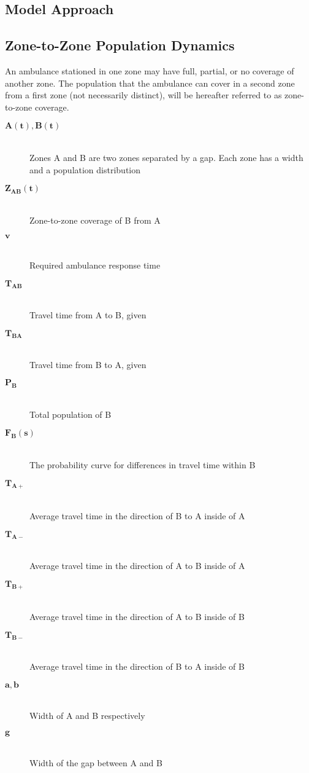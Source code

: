 \documentclass[notitlepage, 12pt]{article}
\begin{document}
\subsection{Model Approach}

\subsection{Zone-to-Zone Population Dynamics}
An ambulance stationed in one zone may have full, partial, or no coverage of another zone. The population
that the ambulance can cover in a second zone from a first zone (not necessarily distinct), will be hereafter referred to as
zone-to-zone coverage.
\begin{description}
    \item[$\mathbf{A(t), B(t)}$] \hfill \\
    	Zones A and B are two zones separated by a gap. Each zone has a width and a population distribution
    \item[$\mathbf{Z_{AB}(t)}$] \hfill \\
    	Zone-to-zone coverage of B from A
    \item[$\mathbf{v}$] \hfill \\
    	Required ambulance response time
    \item[$\mathbf{T_{AB}}$] \hfill \\
    	Travel time from A to B, given
    \item[$\mathbf{T_{BA}}$] \hfill \\
    	Travel time from B to A, given
    \item[$\mathbf{P_B}$] \hfill \\
    	Total population of B
    \item[$\mathbf{F_B(s)}$] \hfill \\
    	The probability curve for differences in travel time within B
    \item[$\mathbf{T_{A+}}$] \hfill \\
    	Average travel time in the direction of B to A inside of A
    \item[$\mathbf{T_{A-}}$] \hfill \\
    	Average travel time in the direction of A to B inside of A
    \item[$\mathbf{T_{B+}}$] \hfill \\
    	Average travel time in the direction of A to B inside of B
    \item[$\mathbf{T_{B-}}$] \hfill \\
    	Average travel time in the direction of B to A inside of B
    \item[$\mathbf{a, b}$] \hfill \\
    	Width of A and B respectively
    \item[$\mathbf{g}$] \hfill \\
    	Width of the gap between A and B
\end{description}
\end{document}
